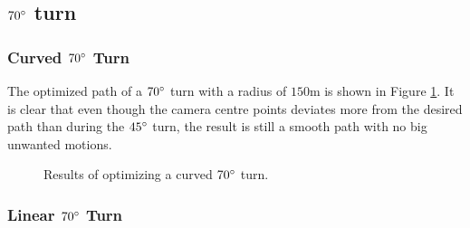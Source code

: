 \subsection{$70\degree$ turn}

\subsubsection{Curved $70\degree$ Turn}

The optimized path of a $70\degree$ turn with a radius of $150$m is shown in Figure \ref{fig:turns_cur_70deg_pos}. It is clear that even though the camera centre points deviates more from the desired path than during the $45\degree$ turn, the result is still a smooth path with no big unwanted motions.

\begin{figure}
	\caption{Results of optimizing a curved $70\degree$ turn.}
	\label{fig:turns_cur_70deg_pos}
\end{figure}


\subsubsection{Linear $70\degree$ Turn}

